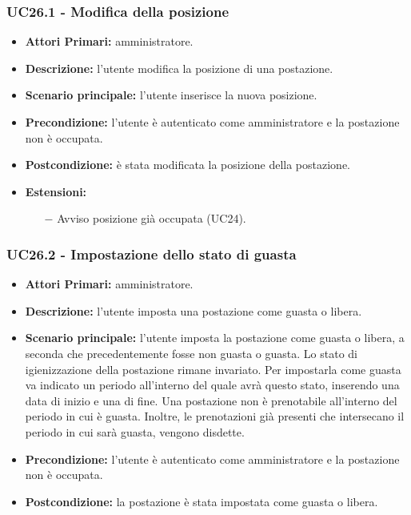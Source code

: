 \subsubsection{ UC26.1 - Modifica della posizione}
\begin{itemize}
	\item\textbf{Attori Primari:}
	amministratore.
	\item\textbf{Descrizione:}
	l'utente modifica la posizione di una postazione.
	\item\textbf{Scenario principale:} 
	l'utente inserisce la nuova posizione.
	\item\textbf{Precondizione:} 
	l'utente è autenticato come amministratore e la postazione non è occupata.
	\item\textbf{Postcondizione:}
	è stata modificata la posizione della postazione.
	\item\textbf{Estensioni:}
	\begin{itemize}
		\item[$-$] Avviso posizione già occupata (UC24).
	\end{itemize}
\end{itemize}

\subsubsection{ UC26.2 - Impostazione dello stato di guasta}
\begin{itemize}
	\item\textbf{Attori Primari:}
	amministratore.
	\item\textbf{Descrizione:}
	l'utente imposta una postazione come guasta o libera.
	\item\textbf{Scenario principale:} 
	l'utente imposta la postazione come guasta o libera, a seconda che precedentemente fosse non guasta o guasta. Lo stato di igienizzazione della postazione rimane invariato. Per impostarla come guasta va indicato un periodo all'interno del quale avrà questo stato, inserendo una data di inizio e una di fine. \newline
	Una postazione non è prenotabile all'interno del periodo in cui è guasta. Inoltre, le prenotazioni già presenti che intersecano il periodo in cui sarà guasta, vengono disdette.
	\item\textbf{Precondizione:} 
	l'utente è autenticato come amministratore e la postazione non è occupata.
	\item\textbf{Postcondizione:}
	la postazione è stata impostata come guasta o libera.
\end{itemize}


